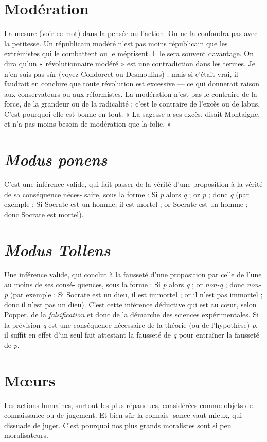 \section{Modération}
La mesure (voir ce mot) dans la pensée ou l’action. On ne
la confondra pas avec la petitesse. Un républicain modéré
n’est pas moins républicain que les extrémistes qui le combattent ou le méprisent.
Il le sera souvent davantage. On dira qu’un « révolutionnaire modéré » est
une contradiction dans les termes. Je n’en suis pas sûr (voyez Condorcet ou
Desmoulins) ; mais si c'était vrai, il faudrait en conclure que toute révolution
est excessive — ce qui donnerait raison aux conservateurs ou aux réformistes.
La modération n’est pas le contraire de la force, de la grandeur ou de la
radicalité ; c’est le contraire de l'excès ou de labus. C’est pourquoi elle est
bonne en tout. « La sagesse a ses excès, disait Montaigne, et n’a pas moins
besoin de modération que la folie. »

\section{{\it Modus ponens}}
C'est une inférence valide, qui fait passer de la vérité
d’une proposition à la vérité de sa conséquence néces-
saire, sous la forme : Si {\it p} alors {\it q} ; or {\it p} ; donc {\it q} (par exemple : Si Socrate est un
homme, il est mortel ; or Socrate est un homme ; donc Socrate est mortel).

\section{{\it Modus Tollens}}
Une inférence valide, qui conclut à la fausseté d’une
proposition par celle de l’une au moins de ses consé-
quences, sous la forme : Si {\it p} alors {\it q} ; or {\it non-q} ; donc {\it non-p} (par exemple : Si
Socrate est un dieu, il est immortel ; or il n’est pas immortel ; donc il n’est
pas un dieu). C’est cette inférence déductive qui est au cœur, selon Popper,
de la {\it falsification} et donc de la démarche des sciences expérimentales. Si la
prévision {\it q} est une conséquence nécessaire de la théorie (ou de l’hypothèse)
{\it p}, il suffit en effet d’un seul fait attestant la fausseté de {\it q} pour entraîner la
fausseté de {\it p}.

\section{M{\oe}urs}
Les actions humaines, surtout les plus répandues, considérées comme
objets de connaissance ou de jugement. Et bien sûr la connais-
sance vaut mieux, qui dissuade de juger. C’est pourquoi nos plus grands moralistes
sont si peu moralisateurs.

